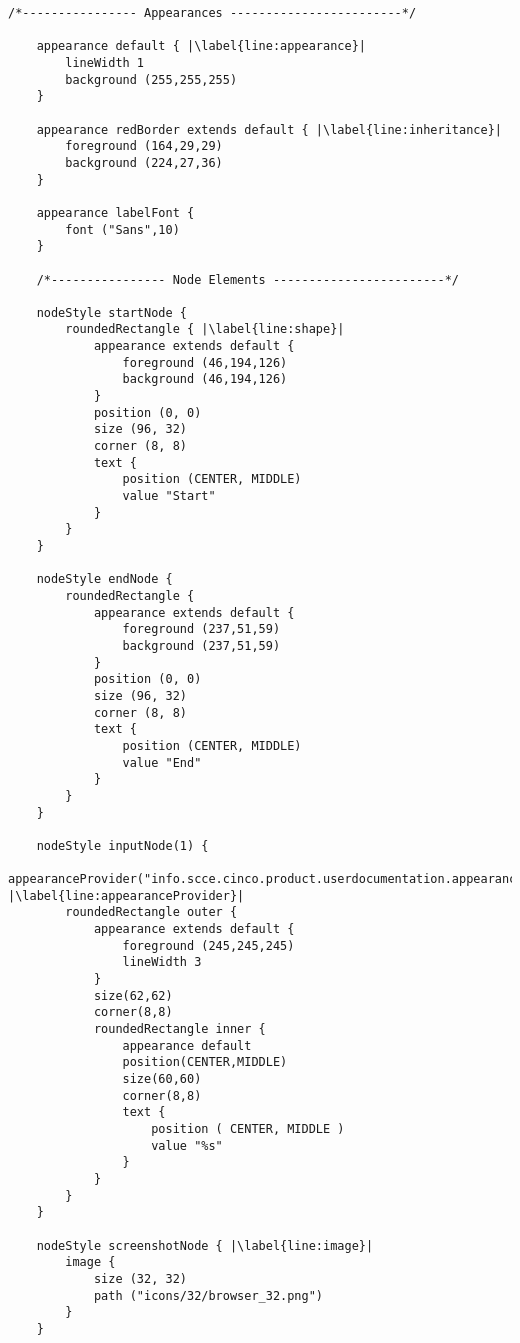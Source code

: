 \begin{lstlisting}[language=MGL, caption={Doc.style: styles to be applied to Doc.mgl}, label=docStyle, escapechar=|, name=docMSL]
    /*---------------- Appearances ------------------------*/

    appearance default { |\label{line:appearance}|
        lineWidth 1
        background (255,255,255)
    }

    appearance redBorder extends default { |\label{line:inheritance}|
        foreground (164,29,29)
        background (224,27,36)
    }

    appearance labelFont {
        font ("Sans",10)
    }

    /*---------------- Node Elements ------------------------*/

    nodeStyle startNode {
        roundedRectangle { |\label{line:shape}|
            appearance extends default {
                foreground (46,194,126)
                background (46,194,126)
            }
            position (0, 0)
            size (96, 32)
            corner (8, 8)
            text {
                position (CENTER, MIDDLE)
                value "Start"
            }
        }
    }

    nodeStyle endNode {
        roundedRectangle {
            appearance extends default {
                foreground (237,51,59)
                background (237,51,59)
            }
            position (0, 0)
            size (96, 32)
            corner (8, 8)
            text {
                position (CENTER, MIDDLE)
                value "End"
            }
        }
    }

    nodeStyle inputNode(1) {
        appearanceProvider("info.scce.cinco.product.userdocumentation.appearance.HighlightInputNodeAppearance") |\label{line:appearanceProvider}|
        roundedRectangle outer {
            appearance extends default {
                foreground (245,245,245)
                lineWidth 3
            }
            size(62,62)
            corner(8,8)
            roundedRectangle inner {
                appearance default
                position(CENTER,MIDDLE)
                size(60,60)
                corner(8,8)
                text {
                    position ( CENTER, MIDDLE )
                    value "%s"
                }
            }
        }
    }

    nodeStyle screenshotNode { |\label{line:image}|
        image {
            size (32, 32)
            path ("icons/32/browser_32.png")
        }
    }
\end{lstlisting}

